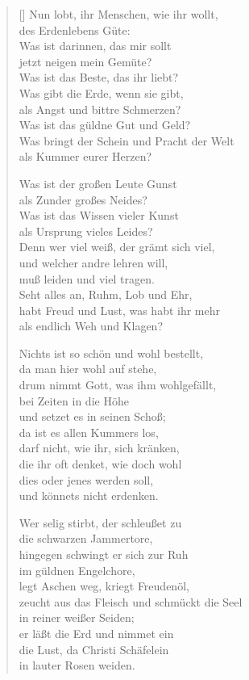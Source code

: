 \begin{multicols}{2}
\begin{verse}[\versewidth]
 Nun lobt, ihr Menschen, wie ihr wollt,\\
des Erdenlebens Güte:\\
Was ist darinnen, das mir sollt\\
jetzt neigen mein Gemüte?\\
Was ist das Beste, das ihr liebt?\\
Was gibt die Erde, wenn sie gibt,\\
als Angst und bittre Schmerzen?\\
Was ist das güldne Gut und Geld?\\
Was bringt der Schein und Pracht der Welt\\
als Kummer eurer Herzen?

 Was ist der großen Leute Gunst\\
als Zunder großes Neides?\\
Was ist das Wissen vieler Kunst\\
als Ursprung vieles Leides?\\
Denn wer viel weiß, der grämt sich viel,\\
und welcher andre lehren will,\\
muß leiden und viel tragen.\\
Seht alles an, Ruhm, Lob und Ehr,\\
habt Freud und Lust, was habt ihr mehr\\
als endlich Weh und Klagen?

 Nichts ist so schön und wohl bestellt,\\
da man hier wohl auf stehe,\\
drum nimmt Gott, was ihm wohlgefällt,\\
bei Zeiten in die Höhe\\
und setzet es in seinen Schoß;\\
da ist es allen Kummers los,\\
darf nicht, wie ihr, sich kränken,\\
die ihr oft denket, wie doch wohl\\
dies oder jenes werden soll,\\
und könnets nicht erdenken.

 Wer selig stirbt, der schleußet zu\\
die schwarzen Jammertore,\\
hingegen schwingt er sich zur Ruh\\
im güldnen Engelchore,\\
legt Aschen weg, kriegt Freudenöl,\\
zeucht aus das Fleisch und schmückt die Seel\\
in reiner weißer Seiden;\\
er läßt die Erd und nimmet ein\\
die Lust, da Christi Schäfelein\\
in lauter Rosen weiden.


\end{verse}
\end{multicols}
